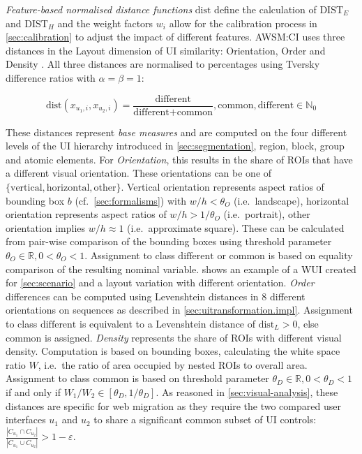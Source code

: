 \emph{Feature-based normalised distance functions} \(\text{dist}\) define the calculation of \(\text{DIST}_E\) and \(\text{DIST}_H\) and the weight factors \(w_i\) allow for the calibration process in \cref{sec:calibration} to adjust the impact of different features.
AWSM:CI uses three distances in the Layout dimension of UI similarity: Orientation, Order and Density \autocite{Heil2016Similarity}.
All three distances are normalised to percentages using Tversky difference ratios with \(\alpha = \beta = 1\):

\begin{equation}\text{dist}(x_{u_1,i}, x_{u_2,i}) = \frac{\text{different}}{\text{different} + \text{common}}, \text{common},\text{different} \in \mathbb{N}_0\label{eq:dist}\end{equation}

These distances represent \emph{base measures} \autocite{ISO/IEEE2017Measurement} and are computed on the four different levels of the UI hierarchy introduced in \cref{sec:segmentation}, region, block, group and atomic elements.
For \emph{Orientation}, this results in the share of ROIs that have a different visual orientation.
These orientations can be one of \(\{\text{vertical}, \text{horizontal}, \text{other}\}\).
Vertical orientation represents aspect ratios of bounding box \(b\) (cf.~\cref{sec:formalisms}) with \(w/h < \theta_O\) (i.e.~landscape), horizontal orientation represents aspect ratios of \(w/h > 1 / \theta_O\) (i.e.~portrait), other orientation implies \(w/h \approx 1\) (i.e.~approximate square).
These can be calculated from pair-wise comparison of the bounding boxes using threshold parameter \(\theta_O\in\mathbb{R}, 0<\theta_O < 1\).
Assignment to class \(\text{different}\) or \(\text{common}\) is based on equality comparison of the resulting nominal variable.
 shows an example of a WUI created for \cref{sec:scenario} and a layout variation with different orientation.
\emph{Order} differences can be computed using Levenshtein distances in 8 different orientations on sequences as described in \cref{sec:uitransformation.impl}.
Assignment to class \(\text{different}\) is equivalent to a Levenshtein distance of \(\text{dist}_L > 0\), else \(\text{common}\) is assigned.
\emph{Density} represents the share of ROIs with different visual density.
Computation is based on bounding boxes, calculating the white space ratio \autocite{Bakaev2019JWE,Oulasvirta2018AIM} \(W\), i.e.~the ratio of area occupied by nested ROIs to overall area.
Assignment to class \(\text{common}\) is based on threshold parameter \(\theta_D\in\mathbb{R}, 0<\theta_D < 1\) if and only if \(W_1/W_2 \in [ \theta_D, 1/\theta_D]\).
As reasoned in \cref{sec:visual-analysis}, these distances are specific for web migration as they require the two compared user interfaces \(u_1\) and \(u_2\) to share a significant common subset of UI controls: \(\frac{|C_{u_1} \cap C_{u_2}|}{|C_{u_1} \cup C_{u_2}|} > 1 - \varepsilon\).

